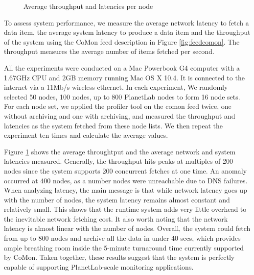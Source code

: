 \begin{figure}[t]
\begin{center}
\caption{Average throughput and latencies per node}
\label{fig:throughput}
\end{center}
\end{figure}

To assess system performance,
we measure the average network latency
to fetch a data item, the average system latency 
to produce a data item
and the throughput of the system using the CoMon feed
description in Figure \ref{fig:feedcomon}. 
The throughput measures the average
number of items fetched per second. 

All the experiments were conducted on a Mac Powerbook G4 computer
with a 1.67GHz CPU and 2GB memory running Mac OS X 10.4. It is
connected to the internet via a 11Mb/s wireless ethernet.
In each experiment, We randomly selected 50 nodes,
100 nodes, up to 800 PlanetLab nodes
to form
16 node sets. For each node set,
we applied the profiler tool on the comon feed twice, one without
archiving and one with archiving, and measured the throughput
and latencies as the system fetched from these node lists. 
We then repeat the experiment ten times and calculate the average values.

Figure \ref{fig:throughput} shows the average throughtput
and the average network and system latencies measured.
Generally, 
the throughput hits peaks at
multiples of 200 nodes since the system supports 
200 concurrent fetches at one time.
An anomaly occurred 
at 400 nodes, as 
a number nodes were unreachable due to DNS failures.
When analyzing latency, the main message is that
while network latency goes up with the number of nodes,
the system latency remains almost constant and relatively
small. This shows that the \padsd{} runtime system adds
very little overhead to the inevitable network fetching
cost. It also worth noting that the network latency is
almost linear with the number of nodes. Overall, the system
could fetch from up to 800 nodes and archive all the data in under 
40 secs, which provides ample breathing room inside the 
5-minute turnaround time currently supported by 
CoMon. Taken together, these results suggest that the system is 
perfectly capable of supporting PlanetLab-scale monitoring applications. 

